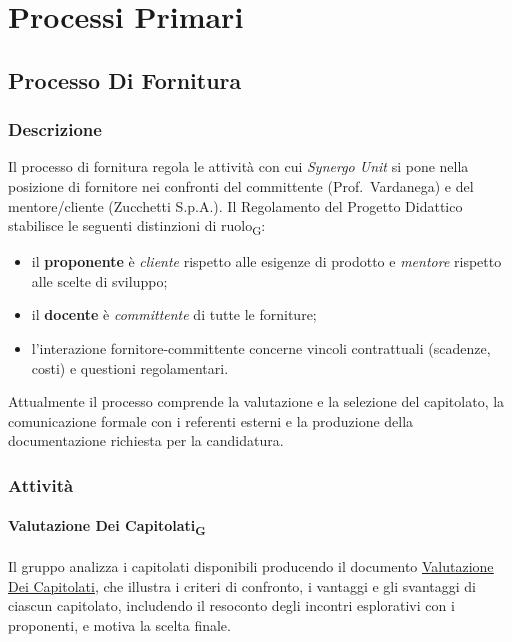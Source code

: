 \section{Processi Primari}

\subsection{Processo Di Fornitura}
\label{sec:fornitura}

\subsubsection{Descrizione}

Il processo di fornitura regola le attività con cui \textit{Synergo Unit} si pone
nella posizione di fornitore nei confronti del committente (Prof.\ Vardanega) e del
mentore/cliente (Zucchetti S.p.A.). Il Regolamento del Progetto Didattico stabilisce
le seguenti distinzioni di ruolo\textsubscript{G}:

\begin{itemize}
  \item il \textbf{proponente} è \textit{cliente} rispetto alle esigenze di prodotto
        e \textit{mentore} rispetto alle scelte di sviluppo;
  \item il \textbf{docente} è \textit{committente} di tutte le forniture;
  \item l'interazione fornitore-committente concerne vincoli contrattuali
        (scadenze, costi) e questioni regolamentari.
\end{itemize}

Attualmente il processo comprende la valutazione e la selezione del capitolato,
la comunicazione formale con i referenti esterni e la produzione della documentazione
richiesta per la candidatura.

\subsubsection{Attività}

\paragraph{Valutazione Dei Capitolati\textsubscript{G}}
Il gruppo analizza i capitolati disponibili producendo il documento
\href{https://synergo-unit-unipd.github.io/Second-Brain/docs/CC/doc_gestionali/doc_esterni/valutazione_dei_capitolati/valutazione_dei_capitolati.pdf}
     {\underline{Valutazione Dei Capitolati}},
che illustra i criteri di confronto, i vantaggi e gli svantaggi di ciascun
capitolato, includendo il resoconto degli incontri esplorativi con i proponenti, e motiva la scelta finale. 

